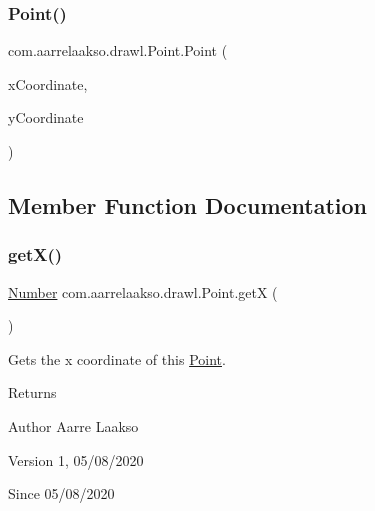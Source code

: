 \subsubsection{\texorpdfstring{Point()}{Point()}\hspace{0.1cm}{\footnotesize\ttfamily [3/3]}}
{\footnotesize\ttfamily com.\+aarrelaakso.\+drawl.\+Point.\+Point (\begin{DoxyParamCaption}\item[{@Not\+Null final Double}]{x\+Coordinate,  }\item[{@Not\+Null final Double}]{y\+Coordinate }\end{DoxyParamCaption})\hspace{0.3cm}{\ttfamily [protected]}}



\subsection{Member Function Documentation}
\mbox{\label{classcom_1_1aarrelaakso_1_1drawl_1_1_point_a39d39c84f2d05c9a2551cbc584c47bfc}} 
\subsubsection{\texorpdfstring{get\+X()}{getX()}}
{\footnotesize\ttfamily \hyperlink{interfacecom_1_1aarrelaakso_1_1drawl_1_1_number}{Number} com.\+aarrelaakso.\+drawl.\+Point.\+getX (\begin{DoxyParamCaption}{ }\end{DoxyParamCaption})\hspace{0.3cm}{\ttfamily [protected]}}



Gets the x coordinate of this \hyperlink{classcom_1_1aarrelaakso_1_1drawl_1_1_point}{Point}. 

\begin{DoxyReturn}{Returns}

\end{DoxyReturn}
\begin{DoxyAuthor}{Author}
Aarre Laakso 
\end{DoxyAuthor}
\begin{DoxyVersion}{Version}
1, 05/08/2020 
\end{DoxyVersion}
\begin{DoxySince}{Since}
05/08/2020 
\end{DoxySince}
\mbox{\label{classcom_1_1aarrelaakso_1_1drawl_1_1_point_a8247f55c36600e067be27a1586255767}} 
